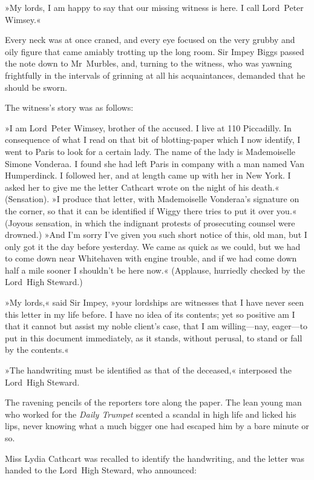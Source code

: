 »My lords, I am happy to say that our missing witness is here. I call
Lord~Peter Wimsey.«

Every neck was at once craned, and every eye focused on the very grubby
and oily figure that came amiably trotting up the long room. Sir Impey
Biggs passed the note down to Mr~Murbles, and, turning to the witness,
who was yawning frightfully in the intervals of grinning at all his
acquaintances, demanded that he should be sworn.

The witness's story was as follows:

»I am Lord~Peter Wimsey, brother of the accused. I live at 110
Piccadilly. In consequence of what I read on that bit of blotting-paper
which I now identify, I went to Paris to look for a certain lady. The
name of the lady is Mademoiselle Simone Vonderaa. I found she had
left Paris in company with a man named Van Humperdinck. I followed
her, and at length came up with her in New York. I asked her to give
me the letter Cathcart wrote on the night of his death.« (Sensation).
»I produce that letter, with Mademoiselle Vonderaa's signature on
the corner, so that it can be identified if Wiggy there tries to put
it over you.« (Joyous sensation, in which the indignant protests of
prosecuting counsel were drowned.) »And I'm sorry I've given you
such short notice of this, old man, but I only got it the day before
yesterday. We came as quick as we could, but we had to come down near
Whitehaven with engine trouble, and if we had come down half a mile
sooner I shouldn't be here now.« (Applause, hurriedly checked by the
Lord~High Steward.)

»My lords,« said Sir Impey, »your lordships are witnesses that I
have never seen this letter in my life before. I have no idea of its
contents; yet so positive am I that it cannot but assist my noble
client's case, that I am willing—nay, eager—to put in this document
immediately, as it stands, without perusal, to stand or fall by the
contents.«

»The handwriting must be identified as that of the deceased,«
interposed the Lord~High Steward.

The ravening pencils of the reporters tore along the paper. The lean
young man who worked for the \textit{Daily Trumpet} scented a scandal in high
life and licked his lips, never knowing what a much bigger one had
escaped him by a bare minute or so.

Miss Lydia Cathcart was recalled to identify the handwriting, and the
letter was handed to the Lord~High Steward, who announced:

